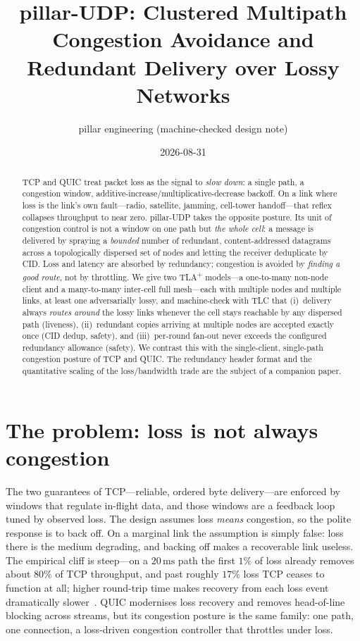 \documentclass[10pt,twocolumn]{article}
\title{\vspace{-3.5em}\bfseries pillar-UDP: Clustered Multipath Congestion
Avoidance and Redundant Delivery over Lossy Networks}
\author{\normalsize pillar engineering \quad(machine-checked design note)}
\date{\normalsize 2026-08-31}
\begin{document}
\maketitle

\begin{abstract}
\noindent
TCP and QUIC treat packet loss as the signal to \emph{slow down}: a single
path, a congestion window, additive-increase/multiplicative-decrease backoff.
On a link where loss is the link's own fault---radio, satellite, jamming,
cell-tower handoff---that reflex collapses throughput to near zero. pillar-UDP
takes the opposite posture. Its unit of congestion control is not a window on
one path but \emph{the whole cell}: a message is delivered by spraying a
\emph{bounded} number of redundant, content-addressed datagrams across a
topologically dispersed set of nodes and letting the receiver deduplicate by
CID. Loss and latency are absorbed by redundancy; congestion is avoided by
\emph{finding a good route}, not by throttling. We give two TLA\textsuperscript{+}
models---a one-to-many non-node client and a many-to-many inter-cell full
mesh---each with multiple nodes and multiple links, at least one adversarially
lossy, and machine-check with TLC that (i)~delivery always \emph{routes around}
the lossy links whenever the cell stays reachable by any dispersed path
(liveness), (ii)~redundant copies arriving at multiple nodes are accepted
exactly once (CID dedup, safety), and (iii)~per-round fan-out never exceeds the
configured redundancy allowance (safety). We contrast this with the
single-client, single-path congestion posture of TCP and QUIC. The redundancy
header format and the quantitative scaling of the loss/bandwidth trade are the
subject of a companion paper.
\end{abstract}

\section{The problem: loss is not always congestion}
The two guarantees of TCP---reliable, ordered byte delivery---are enforced by
windows that regulate in-flight data, and those windows are a feedback loop
tuned by observed loss. The design assumes loss \emph{means} congestion, so the
polite response is to back off. On a marginal link the assumption is simply
false: loss there is the medium degrading, and backing off makes a recoverable
link useless. The empirical cliff is steep---on a $20\,\mathrm{ms}$ path the
first $1\%$ of loss already removes about $80\%$ of TCP throughput, and past
roughly $17\%$ loss TCP ceases to function at all; higher round-trip time makes
recovery from each loss event dramatically slower~\cite{grayson}. QUIC modernises
loss recovery and removes head-of-line blocking across streams, but its
congestion posture is the same family: one path, one connection, a
loss-driven congestion controller that throttles under loss.
\end{document}
